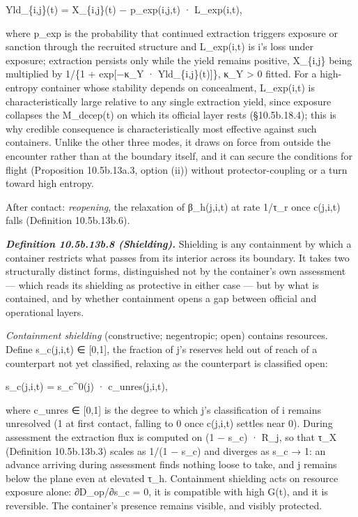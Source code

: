 \documentclass[
]{article}
\begin{document}
Yld\_\{i,j\}(t) = X\_\{i,j\}(t) − p\_exp(i,j,t) · L\_exp(i,t),

where p\_exp is the probability that continued extraction triggers
exposure or sanction through the recruited structure and L\_exp(i,t) is
i's loss under exposure; extraction persists only while the yield
remains positive, X\_\{i,j\} being multiplied by 1/\{1 + exp{[}−κ\_Y ·
Yld\_\{i,j\}(t){]}\}, κ\_Y \textgreater{} 0 fitted. For a high-entropy
container whose stability depends on concealment, L\_exp(i,t) is
characteristically large relative to any single extraction yield, since
exposure collapses the M\_decep(t) on which its official layer rests
(§10.5b.18.4); this is why credible consequence is characteristically
most effective against such containers. Unlike the other three modes, it
draws on force from outside the encounter rather than at the boundary
itself, and it can secure the conditions for flight (Proposition
10.5b.13a.3, option (ii)) without protector-coupling or a turn toward
high entropy.

After contact: \emph{reopening}, the relaxation of β\_h(j,i,t) at rate
1/τ\_r once c(j,i,t) falls (Definition 10.5b.13b.6).

\emph{\textbf{Definition 10.5b.13b.8 (Shielding).}} Shielding is any
containment by which a container restricts what passes from its interior
across its boundary. It takes two structurally distinct forms,
distinguished not by the container's own assessment --- which reads its
shielding as protective in either case --- but by what is contained, and
by whether containment opens a gap between official and operational
layers.

\emph{Containment shielding} (constructive; negentropic; open) contains
resources. Define s\_c(j,i,t) ∈ {[}0,1{]}, the fraction of j's reserves
held out of reach of a counterpart not yet classified, relaxing as the
counterpart is classified open:

s\_c(j,i,t) = s\_c\^{}0(j) · c\_unres(j,i,t),

where c\_unres ∈ {[}0,1{]} is the degree to which j's classification of
i remains unresolved (1 at first contact, falling to 0 once c(j,i,t)
settles near 0). During assessment the extraction flux is computed on (1
− s\_c) · R\_j, so that τ\_X (Definition 10.5b.13b.3) scales as 1/(1 −
s\_c) and diverges as s\_c → 1: an advance arriving during assessment
finds nothing loose to take, and j remains below the plane even at
elevated τ\_h. Containment shielding acts on resource exposure alone:
∂D\_op/∂s\_c = 0, it is compatible with high G(t), and it is reversible.
The container's presence remains visible, and visibly protected.
\end{document}
